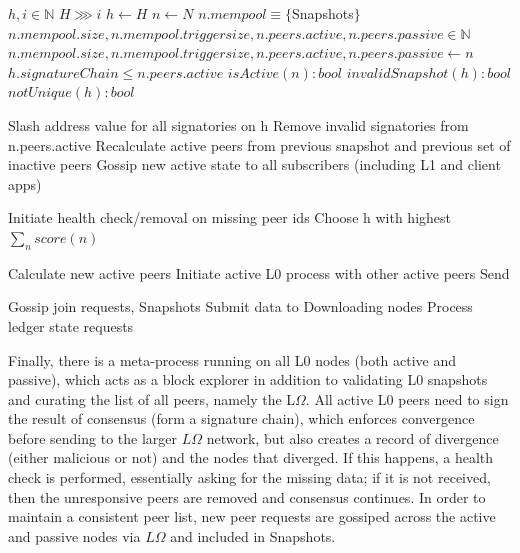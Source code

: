 \documentclass{article}
\begin{document}
\begin{algorithm}
\caption{$L \Omega$}\label{alg:cap}
\begin{algorithmic}
\State $h, i \in \mathbb{N}$
\State $H \ggg  i$
\State $h \gets H$
\State $n \gets N$ 
\State $n.mempool \equiv \{ $Snapshots$ \}$
\State $n.mempool.size, n.mempool.triggersize, n.peers.active, n.peers.passive \in \mathbb{N}$
\State $n.mempool.size, n.mempool.triggersize, n.peers.active, n.peers.passive \gets n$ 
\State $h.signatureChain \leq n.peers.active$ 
\State $isActive(n): bool$
\State $invalidSnapshot(h): bool$
\State $notUnique(h): bool$

		\State Slash address value for all signatories on h
		\State Remove invalid signatories from n.peers.active
			\State Recalculate active peers from previous snapshot and previous set of inactive peers
			\State Gossip new active state to all subscribers (including L1 and client apps)
		\EndIf
		
			\State Initiate health check/removal on missing peer ids
		\EndIf
		\State Choose h with highest $\sum_n{score(n)}$

    			\State Calculate new active peers
				\State Initiate active L0 process with other active peers
			\EndIf
    		\State Send 
		
	    		\State Gossip join requests, Snapshots
			\State Submit data to Downloading nodes
			\State Process ledger state requests
		
	\EndIf
\EndFor
\end{algorithmic}
\end{algorithm}

Finally, there is a meta-process running on all L0 nodes (both active and passive), which acts as a block explorer in addition to validating L0 snapshots and curating the list of all peers, namely the L$\Omega$. All active L0 peers need to sign the result of consensus (form a signature chain), which enforces convergence before sending to the larger $L\Omega$ network, but also creates a record of divergence (either malicious or not) and the nodes that diverged. If this happens, a health check is performed, essentially asking for the missing data; if it is not received, then the unresponsive peers are removed and consensus continues. In order to maintain a consistent peer list, new peer requests are gossiped across the active and passive nodes via $L\Omega$ and included in Snapshots.
\end{document}
